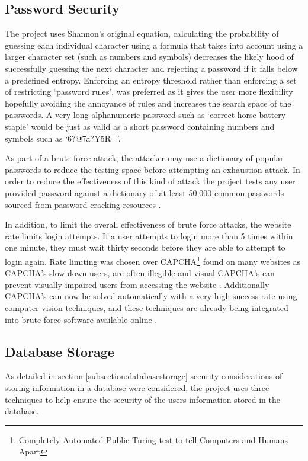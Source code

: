 \subsection{Password Security}
 
The project uses Shannon's original equation, calculating the probability of guessing each individual character using a formula that takes into account using a larger character set (such as numbers and symbols) decreases the likely hood of successfully guessing the next character and rejecting a password if it falls below a predefined entropy.
%
Enforcing an entropy threshold rather than enforcing a set of restricting `password rules', was preferred as it gives the user more flexibility hopefully avoiding the annoyance of rules and increases the search space of the passwords. A very long alphanumeric password such as `correct horse battery staple' would be just as valid as a short password containing numbers and symbols such as `6?@7a?Y5R='.

As part of a brute force attack, the attacker may use a dictionary of popular passwords to reduce the testing space before attempting an exhaustion attack.
%
In order to reduce the effectiveness of this kind of attack the project tests any user provided password against a dictionary of at least 50,000 common passwords sourced from password cracking resources \cite{burr2013electronic}.

In addition, to limit the overall effectiveness of brute force attacks, the website rate limits login attempts. If a user attempts to login more than 5 times within one minute, they must wait thirty seconds before they are able to attempt to login again.
%
Rate limiting was chosen over CAPCHA\footnote{Completely Automated Public Turing test to tell Computers and Humans Apart} found on many websites as CAPCHA's slow down users, are often illegible and visual CAPCHA's can prevent visually impaired users from accessing the website \parencite{matt2005inaccessibility, hegarty2012onlinesecurity}. Additionally CAPCHA's can now be solved automatically with a very high success rate using computer vision techniques, and these techniques are already being integrated into brute force software available online \parencite{goodfellow2013neuralnetwork, 9kweu2014captchasolver, danchev2014captcha, savinkin2012captchasolvers}. 

\subsection{Database Storage}
As detailed in section \ref{subsection:databasestorage} security considerations of storing information in a database were considered, the project uses three techniques to help ensure the security of the users information stored in the database. 


